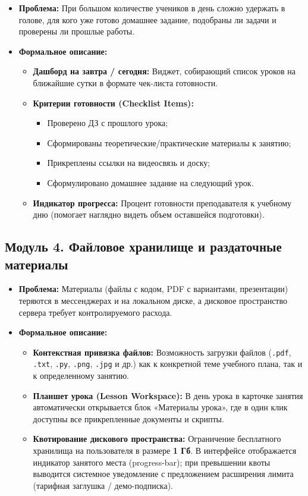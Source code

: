 \documentclass[12pt,a4paper]{article}
\begin{document}
\begin{itemize}
    \item \textbf{Проблема:} При большом количестве учеников в день сложно удержать в голове, для кого уже готово домашнее задание, подобраны ли задачи и проверены ли прошлые работы.
    \item \textbf{Формальное описание:}
    \begin{itemize}
        \item \textbf{Дашборд на завтра / сегодня:} Виджет, собирающий список уроков на ближайшие сутки в формате чек-листа готовности.
        \item \textbf{Критерии готовности (Checklist Items):}
        \begin{itemize}
            \item Проверено ДЗ с прошлого урока;
            \item Сформированы теоретические/практические материалы к занятию;
            \item Прикреплены ссылки на видеосвязь и доску;
            \item Сформулировано домашнее задание на следующий урок.
        \end{itemize}
        \item \textbf{Индикатор прогресса:} Процент готовности преподавателя к учебному дню (помогает наглядно видеть объем оставшейся подготовки).
    \end{itemize}
\end{itemize}

\subsection{Модуль 4. Файловое хранилище и раздаточные материалы}

\begin{itemize}
    \item \textbf{Проблема:} Материалы (файлы с кодом, PDF с вариантами, презентации) теряются в мессенджерах и на локальном диске, а дисковое пространство сервера требует контролируемого расхода.
    \item \textbf{Формальное описание:}
    \begin{itemize}
        \item \textbf{Контекстная привязка файлов:} Возможность загрузки файлов (\texttt{.pdf}, \texttt{.txt}, \texttt{.py}, \texttt{.png}, \texttt{.jpg} и др.) как к конкретной теме учебного плана, так и к определенному занятию.
        \item \textbf{Планшет урока (Lesson Workspace):} В день урока в карточке занятия автоматически открывается блок «Материалы урока», где в один клик доступны все прикрепленные документы и скрипты.
        \item \textbf{Квотирование дискового пространства:} Ограничение бесплатного хранилища на пользователя в размере \textbf{1 Гб}. В интерфейсе отображается индикатор занятого места (progress-bar); при превышении квоты выводится системное уведомление с предложением расширения лимита (тарифная заглушка / демо-подписка).
    \end{itemize}
\end{itemize}
\end{document}
